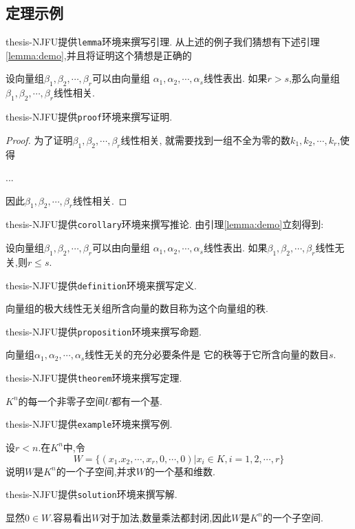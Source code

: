 \documentclass[12pt]{thesis-NJFU}
\begin{document}
\subsection{定理示例}
thesis-NJFU提供\verb|lemma|环境来撰写引理.
从上述的例子我们猜想有下述引理\ref{lemma:demo},并且将证明这个猜想是正确的
\begin{lemma}
	设向量组$\beta_1,\beta_2,\cdots,\beta_r$可以由向量组
	$\alpha_1,\alpha_2,\cdots,\alpha_s$线性表出.
	如果$r>s$,那么向量组$\beta_1,\beta_2,\cdots,\beta_r$线性相关.
	\label{lemma:demo}
\end{lemma}
thesis-NJFU提供\verb|proof|环境来撰写证明.
\begin{proof}
	为了证明$\beta_1,\beta_2,\cdots,\beta_r$线性相关,
	就需要找到一组不全为零的数$k_1,k_2,\cdots,k_r$,使得

	...

	因此$\beta_1,\beta_2,\cdots,\beta_r$线性相关.
\end{proof}
thesis-NJFU提供\verb|corollary|环境来撰写推论.
由引理\ref{lemma:demo}立刻得到:
\begin{corollary}
	设向量组$\beta_1,\beta_2,\cdots,\beta_r$可以由向量组
	$\alpha_1,\alpha_2,\cdots,\alpha_s$线性表出.
	如果$\beta_1,\beta_2,\cdots,\beta_r$线性无关,则$r\leqslant s$.
\end{corollary}
thesis-NJFU提供\verb|definition|环境来撰写定义.
\begin{definition}
	向量组的极大线性无关组所含向量的数目称为这个向量组的秩.
\end{definition}
thesis-NJFU提供\verb|proposition|环境来撰写命题.
\begin{proposition}
	向量组$\alpha_1,\alpha_2,\cdots,\alpha_s$线性无关的充分必要条件是
	它的秩等于它所含向量的数目$s$.
\end{proposition}
thesis-NJFU提供\verb|theorem|环境来撰写定理.
\begin{theorem}
	$K^n$的每一个非零子空间$U$都有一个基.
\end{theorem}
thesis-NJFU提供\verb|example|环境来撰写例.
\begin{example}
	设$r<n$.在$K^n$中,令
	\[
	W = \{ (x_1.x_2,\cdots,x_r,0,\cdots,0) | x_i \in K, i=1,2,\cdots,r \}
	\]
	说明$W$是$K^n$的一个子空间,并求$W$的一个基和维数.
\end{example}
thesis-NJFU提供\verb|solution|环境来撰写解.

\begin{solution}
	显然$0\in W$.容易看出$W$对于加法,数量乘法都封闭,因此$W$是$K^n$的一个子空间.
\end{solution}
\end{document}
